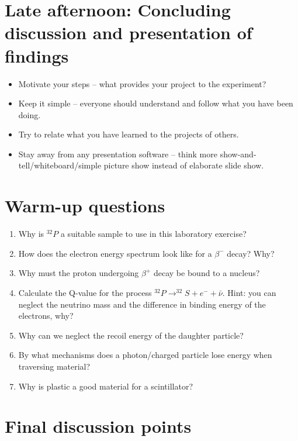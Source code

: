 \documentclass[a4,11pt, notitlepage]{article}
\begin{document}
\section{Late afternoon: Concluding discussion and presentation of findings}
\label{sec:final-presentation}

\begin{itemize}
\item Motivate your steps -- what provides your project to the experiment?
\item Keep it simple -- everyone should understand and follow what you
  have been doing.
\item Try to relate what you have learned to the projects of
  others.
\item Stay away from any presentation software -- think more
  show-and-tell/whiteboard/simple picture show instead of elaborate slide show.

\end{itemize}

\appendix
\section{Warm-up questions}

\begin{enumerate}
\item Why is $^{32}P$ a suitable sample to use in this laboratory exercise?
\item How does the electron energy spectrum look like for a $\beta^-$ decay? Why? 
\item Why must the proton undergoing $\beta^+$ decay be bound to a nucleus?
\item Calculate the Q-value for the process $^{32}P\rightarrow ^{32}S + e^- + \bar{\nu}$. Hint: you can neglect the neutrino mass and the difference in binding energy of the electrons, why? 
\item Why can we neglect the recoil energy of the daughter particle?
\item By what mechanisms does a photon/charged particle lose energy
  when traversing material?
\item Why is plastic a good material for a scintillator?
\end{enumerate}


\section{Final discussion points}
\label{sec:further-discussion}
\end{document}
